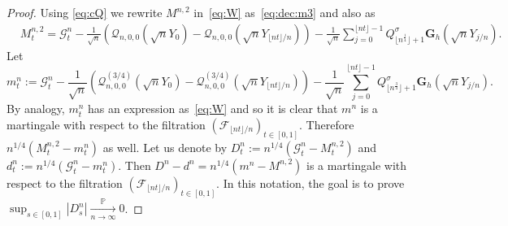 \documentclass[12pt]{article}
\numberwithin{equation}{section}
\theoremstyle{definition}
\theoremstyle{remark}
\newcommand{\convp}[1][]{\xrightarrow[#1]{\PP}}
\newcommand{\PP}{\mathbb{P}}
\newcommand{\EE}{\mathbb{E}}
\newcommand{\cQ}{\mathcal{Q}}
\newcommand{\cF}{\mathcal{F}}
\newcommand{\cG}{\mathcal{G}}
\newcommand{\bfG}[1]{\mathbf{G}_{#1}}
\begin{document}
\begin{proof}
Using \eqref{eq:cQ} we rewrite $M^{n,2}$ in~\eqref{eq:W} as~\eqref{eq:dec:m3} and also as 
\begin{equation} \label{eq:W:2}
\begin{split}
& M^{n,2}_t  
	= \cG^n_t 
			- \frac{1}{\sqrt{n}}  \left( \cQ_{n,0,0}(\sqrt{n} Y_0) -  \cQ_{n,0,0}(\sqrt{n} Y_{\lfloor n t\rfloor/n}) \right)  
			-  \frac{1}{\sqrt{n}}  \sum_{j=0}^{\lfloor n t \rfloor -1} Q^\sigma_{\lfloor n^\frac14\rfloor +1} \bfG{h} (\sqrt n Y_{j/n}).
\end{split}
\end{equation}
%
%
Let 
\begin{equation}{m^{n}_t := \cG^n_t 
			- \frac1{\sqrt{n}} \left( \cQ^{(3/4)}_{n,0,0}(\sqrt{n} Y_0) -  \cQ^{(3/4)}_{n,0,0}(\sqrt{n} Y_{\lfloor n t\rfloor/n}) \right)  
			-  \frac1{\sqrt{n}} \sum_{j=0}^{\lfloor n t \rfloor -1} Q^\sigma_{\lfloor n^\frac34\rfloor +1} \bfG{h} (\sqrt n Y_{j/n}).
}
\end{equation}
By analogy, $m^n_t$ has an expression as~\eqref{eq:W} and so %
it is clear that $m^n$ is a martingale with respect to the filtration $(\cF_{\lfloor n t \rfloor/n})_{t\in [0,1]}$.
Therefore $n^{1/4} (M^{n,2}_t-m^n_t)$ as well.
Let us denote by $D^n_t := n^{1/4} (\cG^n_t - M^{n,2}_t)$ and $d^n_t :=  n^{1/4} (\cG^n_t - m^n_t)$.
Then $D^n-d^n = n^{1/4} (m^n-M^{n,2})$ is a martingale with respect to the filtration $(\cF_{\lfloor n t \rfloor/n})_{t\in [0,1]}$.
In this notation, the goal is to prove 
$\sup_{s\in [0,1]} |D^n_s|\convp[n\to\infty] 0$. 


\end{proof}
\end{document}
